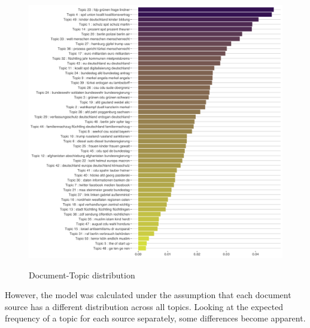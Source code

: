 \documentclass[12pt,a4paper,notitlepage]{article}
\begin{document}
\begin{figure}[H]
\begin{center}
	\caption{Document-Topic distribution}
	\includegraphics[width=\textwidth]{../figs/topic_proportion}
	\label{fig_expected_freq}
	\end{center}
\end{figure}

However, the model was calculated under the assumption that each document source has a different distribution across all topics. Looking at the expected frequency of a topic for each source separately, some differences become apparent.
\end{document}
